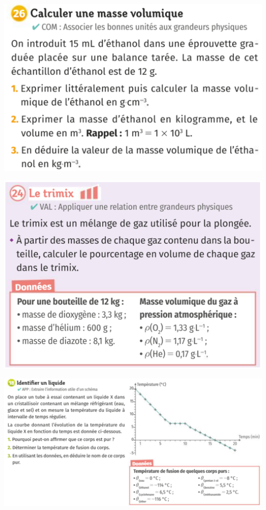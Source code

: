 \includegraphics[scale=0.8]{Images/Exo_3_Chap1.png}
\vspace{1cm}

\includegraphics[scale=0.6]{Images/Exo_24_Chap1.png}
\vspace{1cm}

\includegraphics[scale=1]{Images/Exo_18_Chap1.png}

